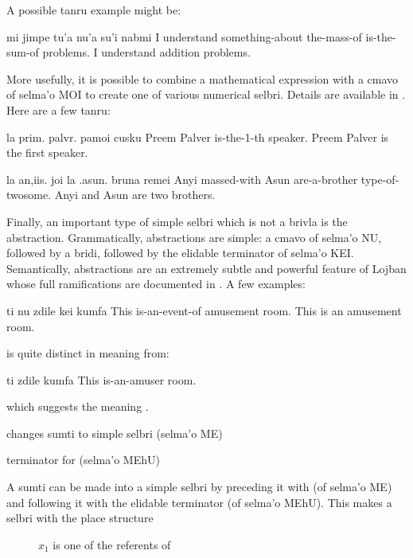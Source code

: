 A possible tanru example might be:
\begin{example}
mi jimpe tu'a nu'a su'i nabmi\n
I understand something-about the-mass-of is-the-sum-of problems.\n
I understand addition problems.
\end{example}

More usefully, it is possible to combine a mathematical
    expression with a cmavo of selma'o MOI to create one of various
    numerical selbri. Details are available in . Here are a few tanru:
\begin{example}
la prim. palvr. pamoi cusku\n
Preem Palver is-the-1-th speaker.\n
Preem Palver is the first speaker.
\end{example}

\begin{example}
la an,iis. joi la .asun. bruna remei\n
Anyi massed-with Asun are-a-brother type-of-twosome.\n
Anyi and Asun are two brothers.
\end{example}

Finally, an important type of simple selbri which is not a
    brivla is the abstraction. Grammatically, abstractions are
    simple: a cmavo of selma'o NU, followed by a bridi, followed by
    the elidable terminator  of selma'o KEI. Semantically,
    abstractions are an extremely subtle and powerful feature of
    Lojban whose full ramifications are documented in . A few examples:
\begin{example}
ti nu zdile kei kumfa\n
This is-an-event-of amusement room.\n
This is an amusement room.
\end{example}

 is quite distinct in meaning
    from:
\begin{example}
ti zdile kumfa\n
This is-an-amuser room.
\end{example}

{\noindent}which suggests the meaning .



\begin{description}
\item[me] changes sumti to simple selbri (selma'o ME)
\item[me'u] terminator for  (selma'o MEhU)
\end{description}
    A sumti can be made into a simple selbri by preceding it with
     (of selma'o ME) and following it with the elidable
    terminator  (of selma'o MEhU). This makes a selbri with
    the place structure 
\begin{description}
\item[] $x_1$ is one of the referents of 
\end{description}

